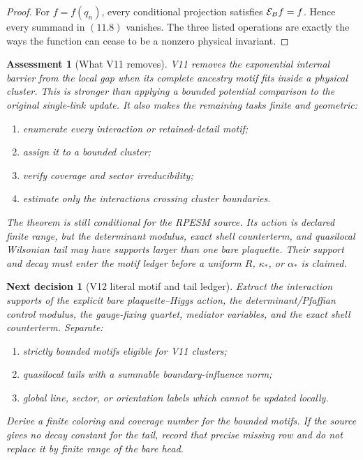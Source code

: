 \documentclass[11pt]{article}
\newtheorem{decision}[theorem]{Next decision}
\newtheorem{assessment}[theorem]{Assessment}
\theoremstyle{remark}
\begin{document}
\begin{proof}
For \(f=f(q_n)\), every conditional projection satisfies
\({\cal E}_Bf=f\).  Hence every summand in \((11.8)\) vanishes.
The three listed operations are exactly the ways the function can
cease to be a nonzero physical invariant.
\end{proof}

\begin{assessment}[What V11 removes]
\label{ass:v15v11-removes}
V11 removes the exponential internal barrier from the local gap
when its complete ancestry motif fits inside a physical cluster.
This is stronger than applying a bounded potential comparison to
the original single-link update.  It also makes the remaining
tasks finite and geometric:
\begin{enumerate}
\item enumerate every interaction or retained-detail motif;
\item assign it to a bounded cluster;
\item verify coverage and sector irreducibility;
\item estimate only the interactions crossing cluster boundaries.
\end{enumerate}

The theorem is still conditional for the RPESM source.  Its action
is declared finite range, but the determinant modulus, exact shell
counterterm, and quasilocal Wilsonian tail may have supports larger
than one bare plaquette.  Their support and decay must enter the
motif ledger before a uniform \(R\), \(\kappa_*\), or
\(\alpha_*\) is claimed.
\end{assessment}

\begin{decision}[V12 literal motif and tail ledger]
\label{dec:v15v11-next}
Extract the interaction supports of the explicit bare
plaquette--Higgs action, the determinant/Pfaffian control modulus,
the gauge-fixing quartet, mediator variables, and the exact shell
counterterm.  Separate:
\begin{enumerate}
\item strictly bounded motifs eligible for V11 clusters;
\item quasilocal tails with a summable boundary-influence norm;
\item global line, sector, or orientation labels which cannot be
      updated locally.
\end{enumerate}
Derive a finite coloring and coverage number for the bounded
motifs.  If the source gives no decay constant for the tail,
record that precise missing row and do not replace it by finite
range of the bare head.
\end{decision}
\end{document}
